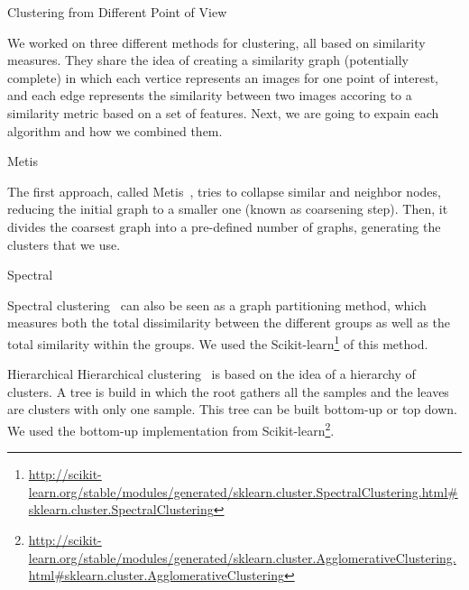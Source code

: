
\begin{subsection}{Clustering from Different Point of View}

We worked on three different methods for clustering, all based on similarity measures.
They share the idea of creating a similarity graph (potentially complete) in which each vertice represents an images for one point of interest, and
each edge represents the similarity between two images accoring to a similarity metric based on a set of features.
Next, we are going to expain each algorithm and how we combined them.


\begin{subsubsection}{Metis}

The first approach, called Metis~\cite{metis},
tries to collapse similar and neighbor nodes, reducing the initial graph to a smaller one (known as coarsening step).
Then, it divides the coarsest graph into a pre-defined number of graphs, generating the clusters that we use.  

\end{subsubsection}

\begin{subsubsection}{Spectral}

Spectral clustering~\cite{spectral} can also be seen as a graph partitioning method, which measures both the total dissimilarity between the different groups 
as well as the total similarity within the groups. We used the Scikit-learn\footnote{\url{http://scikit-learn.org/stable/modules/generated/sklearn.cluster.SpectralClustering.html#sklearn.cluster.SpectralClustering}} of this method. 

\end{subsubsection}

\begin{subsubsection}{Hierarchical}
Hierarchical clustering~\cite{hierarchical} is based on the idea of a hierarchy of clusters. A tree is build in which the root gathers all the samples and the leaves are clusters with only one sample. This tree can be built bottom-up or top down. We used the bottom-up implementation from Scikit-learn\footnote{\url{http://scikit-learn.org/stable/modules/generated/sklearn.cluster.AgglomerativeClustering.html#sklearn.cluster.AgglomerativeClustering}}.


\end{subsubsection}
\end{subsection}

